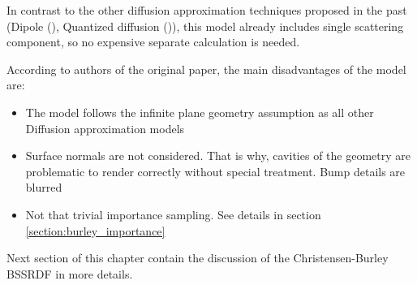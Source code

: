 In contrast to the other diffusion approximation techniques proposed in the past (Dipole
(\cite{Jensen:2001:PMS:383259.383319}), Quantized diffusion
(\cite{D'Eon:2011:QMR:1964921.1964951})), this model already includes single scattering component,
so no expensive separate calculation is needed.

According to authors of the original paper, the main disadvantages of the model are:
\begin{itemize}
  \item {The model follows the infinite plane geometry assumption as all other Diffusion
  approximation models}
  \item {Surface normals are not considered. That is why, cavities of the
  geometry are problematic to render correctly without special treatment. Bump details are blurred}
  \item{Not that trivial importance sampling. See details in section
  \ref{section:burley_importance}}
\end{itemize}

Next section of this chapter contain the discussion of the Christensen-Burley BSSRDF in more
details.
